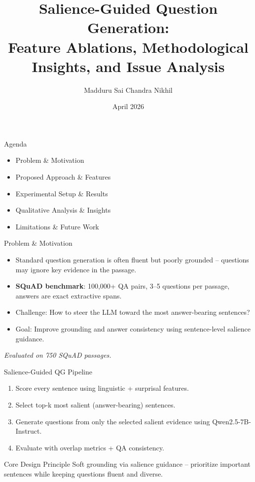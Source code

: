 \documentclass[aspectratio=169]{beamer}
\title{Salience-Guided Question Generation:\\Feature Ablations, Methodological Insights, and Issue Analysis}
\author{Madduru Sai Chandra Nikhil}
\date{April 2026}
\begin{document}
\begin{frame}
  \titlepage
\end{frame}

\begin{frame}{Agenda}
\begin{itemize}
  \item Problem \& Motivation
  \item Proposed Approach \& Features
  \item Experimental Setup \& Results
  \item Qualitative Analysis \& Insights
  \item Limitations \& Future Work
\end{itemize}
\end{frame}

\begin{frame}{Problem \& Motivation}
\small
\begin{itemize}
  \item Standard question generation is often fluent but poorly grounded -- questions may ignore key evidence in the passage.
  \item \textbf{SQuAD benchmark}: 100,000+ QA pairs, 3--5 questions per passage, answers are exact extractive spans.
  \item Challenge: How to steer the LLM toward the most answer-bearing sentences?
  \item Goal: Improve grounding and answer consistency using sentence-level salience guidance.
\end{itemize}

\scriptsize
\textit{Evaluated on 750 SQuAD passages.}
\end{frame}

\begin{frame}{Salience-Guided QG Pipeline}
\small
\begin{enumerate}
  \item Score every sentence using linguistic + surprisal features.
  \item Select top-k most salient (answer-bearing) sentences.
  \item Generate questions from only the selected salient evidence using Qwen2.5-7B-Instruct.
  \item Evaluate with overlap metrics + QA consistency.
\end{enumerate}

\begin{block}{Core Design Principle}
Soft grounding via salience guidance -- prioritize important sentences while keeping questions fluent and diverse.
\end{block}
\end{frame}
\end{document}
